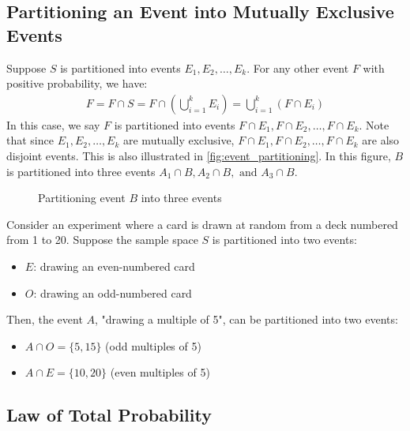 \subsection{Partitioning an Event into Mutually Exclusive Events}

Suppose \( S \) is partitioned into events \( E_1, E_2, \ldots, E_k \).
For any other event \( F \) with positive probability, we have:
\begin{gather*}
	F = F \cap S = F \cap (\bigcup_{i = 1}^{k} E_i) = \bigcup_{i = 1}^{k} (F \cap E_i)
\end{gather*}
In this case, we say \( F \) is partitioned into events \( F \cap E_1, F \cap E_2, \ldots, F \cap E_k \).
Note that since \( E_1, E_2, \ldots, E_k \) are mutually exclusive, \( F \cap E_1, F \cap E_2, \ldots, F \cap E_k \) are also disjoint events.
This is also illustrated in \autoref{fig:event_partitioning}.
In this figure, \( B \) is partitioned into three events \( A_1 \cap B, A_2 \cap B, \text{ and } A_3 \cap B \).
\begin{figure}[t]
\begin{center}
\end{center}
\caption{Partitioning event \( B \) into three events}
\label{fig:event_partitioning}
\end{figure}

\begin{exmp}
	Consider an experiment where a card is drawn at random from a deck numbered from 1 to 20.
	Suppose the sample space \( S \) is partitioned into two events:
	\begin{itemize}
		\item \( E \): drawing an even-numbered card
		\item \( O \): drawing an odd-numbered card
	\end{itemize}
	Then, the event \( A \), "drawing a multiple of 5", can be partitioned into two events:
	\begin{itemize}
		\item \( A \cap O = \{ 5, 15 \} \) (odd multiples of 5)
		\item \( A \cap E = \{ 10, 20 \} \) (even multiples of 5)
	\end{itemize}
\end{exmp}

\subsection{Law of Total Probability}

